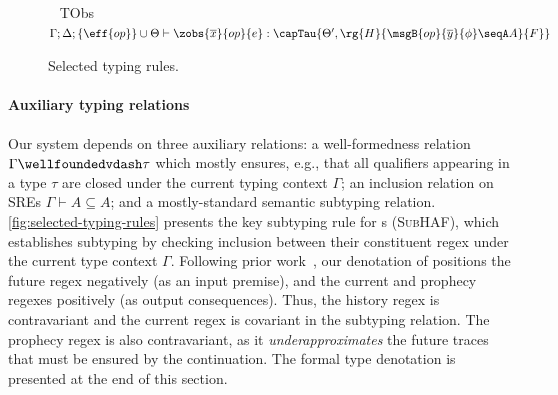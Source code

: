 \begin{figure}[!t]
{\
{TObs}
{
  $\Gamma; \Delta; \{\eff{op}\} \cup \Theta \vdash \zobs{\overline{x}}{op}{e} : \capTau{\Theta', \rg{H}{\msgB{op}{\overline{y}}{\phi} \seqA A}{F}}$
}
\\[.8em]
\quad
{}
}
\caption{Selected typing rules.}
\label{fig:selected-typing-rules}
\vspace*{-.15in}
\end{figure}

\paragraph{Auxiliary typing relations}
Our system depends on three auxiliary relations: a well-formedness
relation $\Gamma \wellfoundedvdash \tau$ which mostly ensures, e.g., that all
qualifiers appearing in a type $\tau$ are closed under the current
typing context $\Gamma$; an inclusion relation on SREs
$\Gamma \vdash A \subseteq A$; and a mostly-standard semantic
subtyping relation.
\autoref{fig:selected-typing-rules} presents the key subtyping rule for \PAT{}s (\textsc{SubHAF}), which establishes subtyping by checking inclusion between their constituent regex under the current type context $\Gamma$.
Following prior work~\cite{ZYDJ24}, our denotation of \tyName positions the future regex negatively (as an input premise), and the current and prophecy regexes positively (as output consequences). Thus, the history regex is contravariant and the current regex is covariant in the subtyping relation. The prophecy regex is also contravariant, as it \emph{underapproximates} the future traces that must be ensured by the continuation. The formal type denotation is presented at the end of this section.


